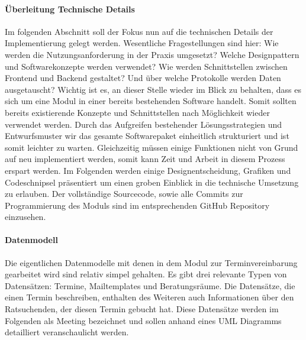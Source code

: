 \documentclass[12pt]{article}
\begin{document}
\paragraph{Überleitung Technische Details}
Im folgenden Abschnitt soll der Fokus nun auf die technischen Details der Implementierung gelegt werden. Wesentliche Fragestellungen sind hier: Wie werden die Nutzungsanforderung in der Praxis umgesetzt? Welche Designpattern und Softwarekonzepte werden verwendet? Wie werden Schnittstellen zwischen Frontend und Backend gestaltet? Und über welche Protokolle werden Daten ausgetauscht? Wichtig ist es, an dieser Stelle wieder im Blick zu behalten, dass es sich um eine Modul in einer bereits bestehenden Software handelt. Somit sollten bereits existierende Konzepte und Schnittstellen nach Möglichkeit wieder verwendet werden. Durch das Aufgreifen bestehender Lösungsstrategien und Entwurfsmuster wir das gesamte Softwarepaket einheitlich strukturiert und ist somit leichter zu warten. Gleichzeitig müssen einige Funktionen nicht von Grund auf neu implementiert werden, somit kann Zeit und Arbeit in diesem Prozess erspart werden.\cite{wiederverwSoftware}
Im Folgenden werden einige Designentscheidung, Grafiken und Codeschnipsel präsentiert um einen groben Einblick in die technische Umsetzung zu erlauben. Der vollständige Sourcecode, sowie alle Commits zur Programmierung des Moduls sind im entsprechenden GitHub Repository einzusehen.\cite{stubegruRepo}

\paragraph{Datenmodell}
Die eigentlichen Datenmodelle mit denen in dem Modul zur Terminvereinbarung gearbeitet wird sind relativ simpel gehalten. Es gibt drei relevante Typen von Datensätzen: Termine, Mailtemplates und Beratungsräume. Die Datensätze, die einen Termin beschreiben, enthalten des Weiteren auch Informationen über den Ratsuchenden, der diesen Termin gebucht hat. Diese Datensätze werden im Folgenden als Meeting bezeichnet und sollen anhand eines UML Diagramms detailliert veranschaulicht werden.
\end{document}
